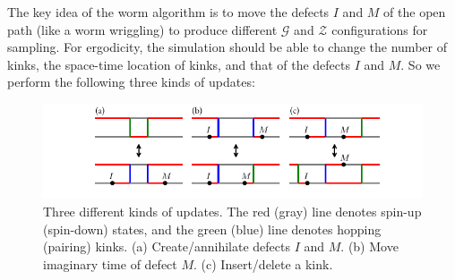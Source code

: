 \documentclass{article}
\theoremstyle{plain} \newtheorem{thm}{Theorem}[section]
\theoremstyle{definition} \newtheorem{df}{Definition}[section]
\theoremstyle{definition} \newtheorem{eg}{Example}
\theoremstyle{remark} \newtheorem*{rmk}{Remark}
\begin{document}
The key idea of the worm algorithm is to move the defects $I$ and $M$ of the open path (like a worm wriggling) to produce different $\mathcal{G}$ and $\mathcal{Z}$ configurations for sampling. For ergodicity, the simulation should be able to change the number of kinks, the space-time location of kinks, and that of the defects $I$ and $M$. So we perform the following three kinds of updates:
\begin{figure}[htpb]
  \centering
  \includegraphics[width=\textwidth]{figs/updates.pdf}
  \caption{Three different kinds of updates. The red (gray) line denotes spin-up (spin-down) states, and the green (blue) line denotes hopping (pairing) kinks. (a) Create/annihilate defects $I$ and $M$. (b) Move imaginary time of defect $M$. (c) Insert/delete a kink.}
  \label{fig:updates}
\end{figure}
\end{document}
